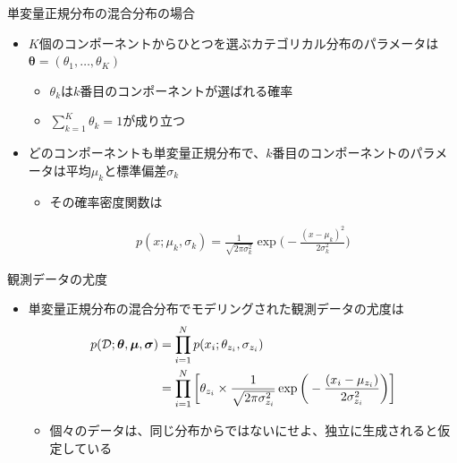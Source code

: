 \documentclass[aspectratio=169,unicode,dvipdfmx,14pt]{beamer}
\begin{document}
\begin{frame}{単変量正規分布の混合分布の場合}
\begin{itemize}
\item $K$個のコンポーネントからひとつを選ぶカテゴリカル分布のパラメータは
$\bm{\theta} = (\theta_1,\ldots,\theta_K)$
\begin{itemize}
\item $\theta_k$は$k$番目のコンポーネントが選ばれる確率
\item $\sum_{k=1}^K \theta_k = 1$が成り立つ
\end{itemize}
\item どのコンポーネントも単変量正規分布で、$k$番目のコンポーネントのパラメータは平均$\mu_k$と標準偏差$\sigma_k$
\begin{itemize}
\item その確率密度関数は
\end{itemize}
\begin{align}
p(x;\mu_k,\sigma_k) = \frac{1}{\sqrt{2\pi\sigma_k^2}}\exp\Big( - \frac{(x - \mu_k)^2}{2\sigma_k^2} \Big)
\end{align}
\end{itemize}
\end{frame}

\begin{frame}{観測データの尤度}
\begin{itemize}
\item 単変量正規分布の混合分布でモデリングされた観測データの尤度は
\vspace{-.1in}
\begin{align}
p(\mathcal{D};\bm{\theta},\bm{\mu},\bm{\sigma})
& = \prod_{i=1}^N p(x_i ; \theta_{z_i}, \sigma_{z_i}) \notag \\ &
= \prod_{i=1}^N \bigg[ \theta_{z_i} \times \frac{1}{\sqrt{2\pi\sigma_{z_i}^2}}\exp\bigg( - \frac{(x_i - \mu_{z_i})}{2\sigma_{z_i}^2} \bigg) \bigg]
\end{align}
\vspace{-.1in}
\begin{itemize}
\item 個々のデータは、同じ分布からではないにせよ、独立に生成されると仮定している
\end{itemize}
\end{itemize}
\end{frame}
\end{document}
